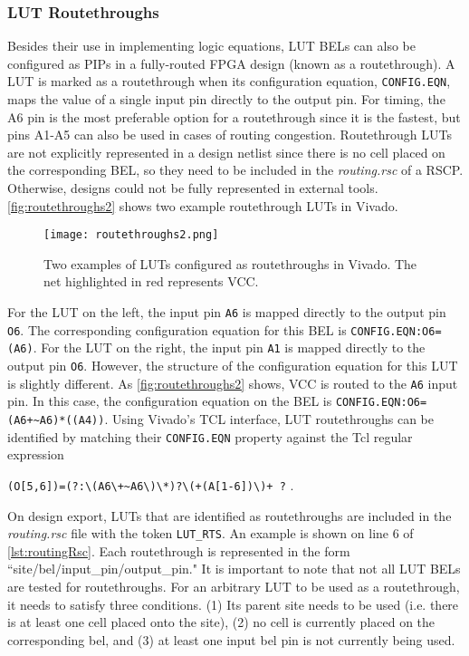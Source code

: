 \subsubsection{LUT Routethroughs} \label{sec:belRoutethroughs}
Besides their use in implementing logic equations, LUT BELs can also be
configured as PIPs in a fully-routed FPGA design (known as a routethrough). A
LUT is marked as a routethrough when its configuration equation,
\texttt{CONFIG.EQN}, maps the value of a single input pin directly to the
output pin. For timing, the A6 pin is the most preferable option for
a routethrough since it is the fastest, but pins A1-A5 can also be
used in cases of routing congestion. Routethrough LUTs are not explicitly
represented in a design netlist since there is no cell placed on the
corresponding BEL, so they need to be included in the \textit{routing.rsc} of a
RSCP. Otherwise, designs could not be fully represented in external tools.
\autoref{fig:routethroughs2} shows two example routethrough LUTs in Vivado.

\begin{figure}[h]
  \centering
  \texttt{[image: routethroughs2.png]}
  \caption{Two examples of LUTs configured as routethroughs in Vivado. The net
  highlighted in red represents VCC.}
  \label{fig:routethroughs2}
\end{figure}

For the LUT on the left, the input pin \texttt{A6} is mapped directly to the 
output pin \texttt{O6}. The corresponding configuration equation for this BEL is 
\texttt{CONFIG.EQN:O6=(A6)}. For the LUT on the right, the input pin \texttt{A1}
is mapped directly to the output pin \texttt{O6}. However, the structure of the
configuration equation for this LUT is slightly different. As 
\autoref{fig:routethroughs2} shows, VCC is routed to the \texttt{A6} input pin.
In this case, the configuration equation on the BEL is
\texttt{CONFIG.EQN:O6=(A6+{\textasciitilde}A6)*((A4))}. Using Vivado's TCL
interface, LUT routethroughs can be identified by matching their
\texttt{CONFIG.EQN} property against the Tcl regular expression

\begin{center}
\verb!(O[5,6])=(?:\(A6\+~A6\)\*)?\(+(A[1-6])\)+ ?!
.
\end{center}

On design export, LUTs that are identified as routethroughs are included
in the \textit{routing.rsc} file with the token \texttt{LUT\_RTS}. An example is
shown on line 6 of \autoref{lst:routingRsc}. Each routethrough is represented
in the form ``site/bel/input\_pin/output\_pin." It is important to note that not
all LUT BELs are tested for routethroughs. For an arbitrary LUT to be
used as a routethrough, it needs to satisfy three conditions. (1) Its parent
site needs to be used (i.e. there is at least one cell placed onto the site),
(2) no cell is currently placed on the corresponding bel, and (3) at least one
input bel pin is not currently being used.

